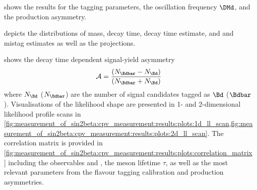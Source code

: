 shows the
results for the tagging parameters, the \BdBdbar oscillation frequency $\DMd$,
and the production asymmetry.

depicts the distributions of mass, decay time, decay time estimate, and \OS and
\SSpi mistag estimates as well as the \PDF projections.

 shows
the decay time dependent signal-yield asymmetry
%
\begin{equation}
  \mathcal{A} = \frac{(N_{\Bdbar} - N_{\Bd})}{(N_{\Bdbar} + N_{\Bd})}
\end{equation}
%
where $N_{\Bd}$ ($N_{\Bdbar}$) are the number of \BdToJpsiKS signal candidates
tagged as $\Bd$ ($\Bdbar$). Visualisations of the likelihood shape are presented
in 1- and 2-dimensional likelihood profile scans in 
\cref{fig:measurement_of_sin2beta:cpv_measurement:results:plots:1d_ll_scan,fig:measurement_of_sin2beta:cpv_measurement:results:plots:2d_ll_scan}. 
The correlation matrix is provided in 
\cref{fig:measurement_of_sin2beta:cpv_measurement:results:plots:correlation_matrix} 
including the \CP observables \SJpsiKS and \CJpsiKS, the \Bd meson lifetime
$\tau$, as well as the most relevant parameters from the flavour tagging
calibration and production asymmetries.
%
